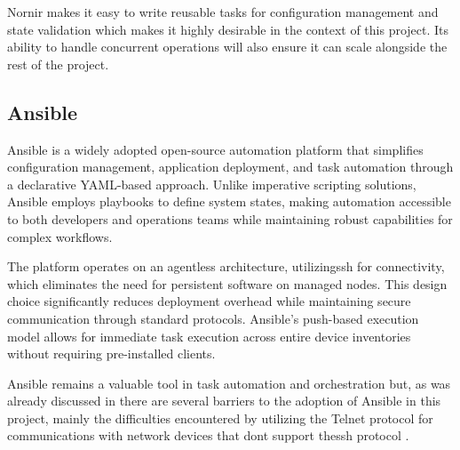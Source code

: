     Nornir makes it easy to write reusable tasks for configuration management and state validation which makes it 
    highly desirable in the context of this project. Its ability to handle concurrent operations will also ensure it can scale 
    alongside the rest of the project.

  \subsection{Ansible}

    Ansible is a widely adopted open-source automation platform that simplifies configuration management, application deployment, 
    and task automation through a declarative YAML-based approach. Unlike imperative scripting solutions, Ansible employs playbooks 
    to define system states, making automation accessible to both developers and operations teams while maintaining robust capabilities 
    for complex workflows.

    The platform operates on an agentless architecture, utilizing\ac{ssh} for connectivity, which eliminates the need for persistent software 
    on managed nodes. This design choice significantly reduces deployment overhead while maintaining secure communication through standard 
    protocols. Ansible's push-based execution model allows for immediate task execution across entire device inventories without requiring 
    pre-installed clients.

    Ansible remains a valuable tool in task automation and orchestration but, as was already discussed in\cite{santos2024} there are several 
    barriers to the adoption of Ansible in this project, mainly the difficulties encountered by utilizing the Telnet protocol for 
    communications with network devices that dont support the\ac{ssh} protocol .